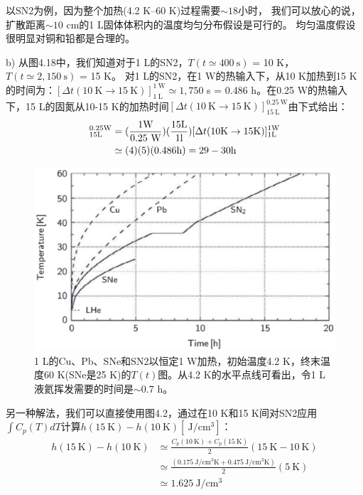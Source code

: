 以SN2为例，因为整个加热(4.2 K–60 K)过程需要$\sim 18$小时，
我们可以放心的说，扩散距离$\sim 10$ cm的1 L固体体积内的温度均匀分布假设是可行的。
均匀温度假设很明显对铜和铅都是合理的。

b) 从图4.18中，我们知道对于1 L的SN2，$T(t\simeq 400\ \mathrm{s})$ = 10 K，$T(t\simeq 2,150\ \mathrm{s})$ = 15 K。
对1 L的SN2，在1 W的热输入下，从10 K加热到15 K的时间为：$[\Delta t(10 \ \mathrm{K}\rightarrow 15\ \mathrm{K})]_{1\ \mathrm{L}}^{1\ \mathrm{W}}\simeq 1,750$ s = 0.486 h。在0.25 W的热输入下，15 L的固氮从10-15 K的加热时间$[\Delta t(10 \ \mathrm{K}\rightarrow 15 \ \mathrm{K})]_{15 \ \mathrm{L}}^{0.25\ \mathrm{W}}$由下式给出：
\begin{align*}%
[\Delta t(10\mathrm{K}\rightarrow 15\ \mathrm{K})]_{15\mathrm{L}}^{0.25\mathrm{W}}&=(\frac{1\mathrm{W}}{0.25\ \mathrm{W}})(\frac{15\mathrm{L}}{1\mathrm{l}})[\Delta t(10\mathrm{K}\rightarrow 15\mathrm{K})]_{1\mathrm{L}}^{1\mathrm{W}}\\\notag
&\simeq (4)(5)(0.486\mathrm{h})=29-30\mathrm{h}
\end{align*}

\begin{figure}[htbp]
	\centering
	\includegraphics[scale=0.6]{chpt4/figs/fig4.18.eps}
	\caption{1 L的Cu、Pb、SNe和SN2以恒定1 W加热，初始温度4.2 K，终末温度60 K(SNe是25 K)的$T(t)$图。从4.2 K的水平点线可看出，令1 L液氦挥发需要的时间是$\sim 0.7$ h。}
\end{figure}

另一种解法，我们可以直接使用图4.2，通过在10 K和15 K间对SN2应用$\int C_p(T)dT$计算$h(15\ \mathrm{K})−h(10\ \mathrm{K}) [\ \mathrm{J/cm^3}]$：
\begin{align*}%
h(15\ \mathrm{K})-h(10\ \mathrm{K})&\simeq\frac{C_p(10\ \mathrm{K})+C_p(15\ \mathrm{K})}{2}(15\ \mathrm{K}-10\ \mathrm{K})\\
&\simeq\frac{(0.175\ \mathrm{J/cm^3K}+0.475\ \mathrm{J/cm^3K} )}{2}(5\ \mathrm{K})\\
&\simeq 1.625\ \mathrm{J/cm^3}
\end{align*}

